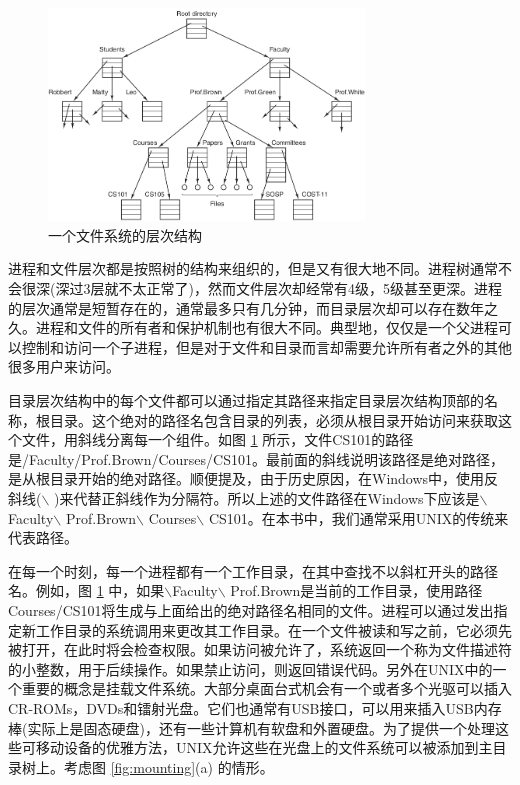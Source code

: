 	\begin{figure}[ht]\small
		\centering
		\includegraphics[width=0.75\textwidth]{FIG/1-14.png}
		\caption{一个文件系统的层次结构}\label{fig:fshierarcy}
	\end{figure}
	
	进程和文件层次都是按照树的结构来组织的，但是又有很大地不同。进程树通常不会很深(深过3层就不太正常了)，然而文件层次却经常有4级，5级甚至更深。进程的层次通常是短暂存在的，通常最多只有几分钟，而目录层次却可以存在数年之久。进程和文件的所有者和保护机制也有很大不同。典型地，仅仅是一个父进程可以控制和访问一个子进程，但是对于文件和目录而言却需要允许所有者之外的其他很多用户来访问。
	
	目录层次结构中的每个文件都可以通过指定其路径来指定目录层次结构顶部的名称，根目录。这个绝对的路径名包含目录的列表，必须从根目录开始访问来获取这个文件，用斜线分离每一个组件。如图 \ref{fig:fshierarcy} 所示，文件CS101的路径是/Faculty/Prof.Brown/Courses/CS101。最前面的斜线说明该路径是绝对路径，是从根目录开始的绝对路径。顺便提及，由于历史原因，在Windows中，使用反斜线($\backslash$ )来代替正斜线作为分隔符。所以上述的文件路径在Windows下应该是$\backslash$Faculty$\backslash$ Prof.Brown$\backslash$ Courses$\backslash$ CS101。在本书中，我们通常采用UNIX的传统来代表路径。

	在每一个时刻，每一个进程都有一个工作目录，在其中查找不以斜杠开头的路径名。例如，图 \ref{fig:fshierarcy} 中，如果$\backslash$Faculty$\backslash$ Prof.Brown是当前的工作目录，使用路径Courses/CS101将生成与上面给出的绝对路径名相同的文件。进程可以通过发出指定新工作目录的系统调用来更改其工作目录。在一个文件被读和写之前，它必须先被打开，在此时将会检查权限。如果访问被允许了，系统返回一个称为文件描述符的小整数，用于后续操作。如果禁止访问，则返回错误代码。另外在UNIX中的一个重要的概念是挂载文件系统。大部分桌面台式机会有一个或者多个光驱可以插入CR-ROMs，DVDs和镭射光盘。它们也通常有USB接口，可以用来插入USB内存棒(实际上是固态硬盘)，还有一些计算机有软盘和外置硬盘。为了提供一个处理这些可移动设备的优雅方法，UNIX允许这些在光盘上的文件系统可以被添加到主目录树上。考虑图 \ref{fig:mounting}(a) 的情形。
	
